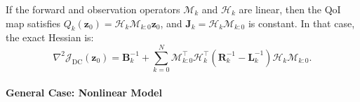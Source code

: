 \documentclass[final,1p,times]{elsarticle}
\begin{document}
If the forward and observation operators $ \mathcal{M}_k $ and $ \mathcal{H}_k $ are linear, then the QoI map satisfies $ Q_k(\mathbf{z}_0) = \mathcal{H}_k \mathcal{M}_{k:0} \mathbf{z}_0 $, and $ \mathbf{J}_k = \mathcal{H}_k \mathcal{M}_{k:0} $ is constant. 
In that case, the exact Hessian is:
\begin{equation}
    \nabla^2 \mathcal{J}_{\mathrm{DC}}(\mathbf{z}_0) =
    \mathbf{B}_k^{-1} + \sum_{k=0}^N \mathcal{M}_{k:0}^\top \mathcal{H}_k^\top \left( \mathbf{R}_k^{-1} - \mathbf{L}_k^{-1} \right) \mathcal{H}_k \mathcal{M}_{k:0}.
\end{equation}

\paragraph{General Case: Nonlinear Model}
\end{document}
